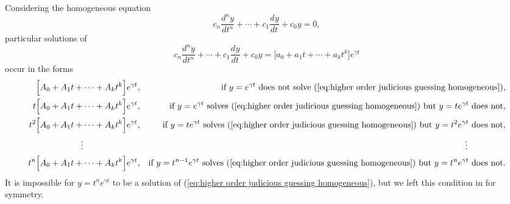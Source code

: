 \documentclass{myart}
\newcommand{\eq}[1]{(\ref{eq:#1})}
\newcommand{\deriv}[3][]{\frac{d^{#1}#2}{d#3^{#1}}}
\begin{document}
Considering the homogeneous equation
\begin{equation} \label{eq:higher order judicious guessing homogeneous}
c_n \deriv[n]{y}{t} + \cdots + c_1 \deriv{y}{t} + c_0 y = 0,
\end{equation}
particular solutions of
\begin{equation*}
c_n \deriv[n]{y}{t} + \cdots + c_1 \deriv{y}{t} + c_0 y = \Big[a_0 + a_1 t + \cdots + a_k t^k\Big]e^{\gamma t}
\end{equation*}
occur in the forms
\begin{align*}
\Big[A_0 + A_1 t + \cdots + A_k t^k\Big]e^{\gamma t}, && \text{if $y = e^{\gamma t}$ does not solve \eq{higher order judicious guessing homogeneous}}, \\
t\Big[A_0 + A_1 t + \cdots + A_k t^k\Big]e^{\gamma t}, && \text{if $y = e^{\gamma t}$ solves \eq{higher order judicious guessing homogeneous} but $y = te^{\gamma t}$ does not}, \\
t^2\Big[A_0 + A_1 t + \cdots + A_k t^k\Big]e^{\gamma t}, && \text{if $y = te^{\gamma t}$ solves \eq{higher order judicious guessing homogeneous} but $y = t^2e^{\gamma t}$ does not}, \\
\vdots \hspace{66.25pt} && \vdots \hspace{44.5pt} \\
t^n\Big[A_0 + A_1 t + \cdots + A_k t^k\Big]e^{\gamma t}, && \text{if $y = t^{n-1} e^{\gamma t}$ solves \eq{higher order judicious guessing homogeneous} but $y = t^n e^{\gamma t}$ does not}. \\
\end{align*}
It is impossible for $y = t^n e^{\gamma t}$ to be a solution of \eq{higher order judicious guessing homogeneous}, but we left this condition in for symmetry.
\end{document}
